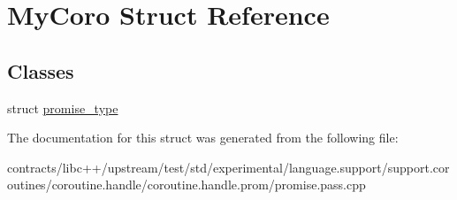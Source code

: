 \hypertarget{struct_my_coro}{}\section{My\+Coro Struct Reference}
\label{struct_my_coro}
\subsection*{Classes}
\begin{DoxyCompactItemize}
\item 
struct \mbox{\hyperlink{struct_my_coro_1_1promise__type}{promise\+\_\+type}}
\end{DoxyCompactItemize}


The documentation for this struct was generated from the following file\+:\begin{DoxyCompactItemize}
\item 
contracts/libc++/upstream/test/std/experimental/language.\+support/support.\+coroutines/coroutine.\+handle/coroutine.\+handle.\+prom/promise.\+pass.\+cpp\end{DoxyCompactItemize}
